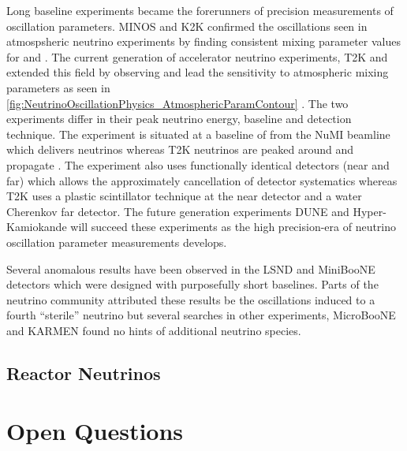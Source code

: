 Long baseline experiments became the forerunners of precision measurements of oscillation parameters. MINOS \cite{PhysRevLett.97.191801} and K2K \cite{PhysRevLett.9.36} confirmed the \quickmath{\nu_{\mu} \rightarrow \nu_{\mu}} oscillations seen in atmospsheric neutrino experiments by finding consistent mixing parameter values for \sinsqatm and \delmsqatm. The current generation of accelerator neutrino experiments, T2K and \NOVA extended this field by observing  and lead the sensitivity to atmospheric mixing parameters as seen in \autoref{fig:NeutrinoOscillationPhysics_AtmosphericParamContour} \cite{PhysRevLett.123.151803}. The two experiments differ in their peak neutrino energy, baseline and detection technique. The \NOVA experiment is situated at a baseline of  from the NuMI beamline which delivers  neutrinos whereas T2K neutrinos are peaked around  and propagate . The \NOVA experiment also uses functionally identical detectors (near and far) which allows the approximately cancellation of detector systematics whereas T2K uses a plastic scintillator technique at the near detector and a water Cherenkov far detector. The future generation experiments DUNE \cite{Abi2020-cm} and Hyper-Kamiokande \cite{Hyper-Kamiokande_Proto-Collaboration2015-ac} will succeed these experiments as the high precision-era of neutrino oscillation parameter measurements develops.

Several anomalous results have been observed in the LSND \cite{PhysRevD.64.112007} and MiniBooNE \cite{PhysRevLett.110.161801} detectors which were designed with purposefully short baselines. Parts of the neutrino community attributed these results be the oscillations induced to a fourth ``sterile'' neutrino \cite{Blanco_2020} but several searches in other experiments, MicroBooNE \cite{10.48550/arxiv.2110.14054} and KARMEN \cite{PhysRevD.65.112001} found no hints of additional neutrino species. 

\subsection{Reactor Neutrinos}
\label{subsec:NeutrinoOscillationPhysics_ReactorNeutrinos}

\section{Open Questions}
\label{sec:NeutrinoOscillationPhysics_OpenQuestions}
